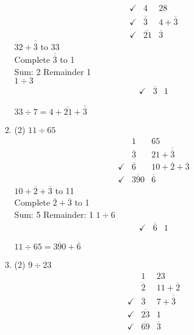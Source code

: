 \documentclass[12pt]{article}
\begin{document}
\begin{enumerate}[label=\textbf{\arabic*}.]
\begin{enumerate}
\begin{tasks}[label=]
\begin{align*}
            \checkmark&4 & 28 \\
            \checkmark&\overline{\overline{3}} & 4 + \overline{\overline{3}} \\
            \checkmark&\overline{21} & \overline{3}
        \end{align*}
         $32 + \overline{\overline{3}}$ to 33 \\
        Complete $\overline{\overline{3}}$ to 1 \\
        Sum: 2 Remainder 1 \\
        $1 \div 3$
        \begin{align*}
            \checkmark&\overline{3} & 1
        \end{align*}
    \end{tasks}
    $33 \div 7 = 4 + \overline{21} + \overline{\overline{3}}$
    \item 
    \begin{tasks}[label=] (2)
        \task$11 \div 65$
        \begin{align*}
            &1 & 65 \\
            &\overline{3} & 21 + \overline{\overline{3}} \\
            \checkmark&\overline{6} & 10 + \overline{2} + \overline{3} \\
            \checkmark&\overline{390} & \overline{6}
        \end{align*}
         $10 + \overline2 + \overline3$ to 11 \\
        Complete $\overline2 + \overline3$ to 1 \\
        Sum: 5 Remainder: 1
        $1 \div 6$
        \begin{align*}
            \checkmark&\overline6 & 1
        \end{align*}
    \end{tasks}
    $11 \div 65 = \overline{390} + \overline6$
    \item 
    \begin{tasks}[label=] (2)
        \task$9 \div 23$
        \begin{align*}
            &1 & 23 \\
            &\overline{2} & 11 + \overline2 \\
            \checkmark&\overline3 & 7 + \overline{\overline3} \\
            \checkmark&\overline{23} & 1 \\
            \checkmark&\overline{69} & \overline{3}
        \end{align*}

\end{tasks}
\end{enumerate}
\end{enumerate}
\end{document}
